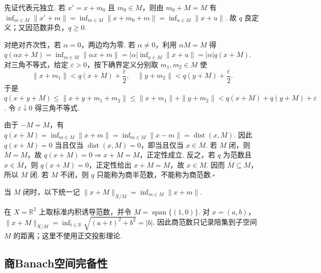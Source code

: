 \begin{FAProof}
先证代表元独立. 若 \(\displaystyle x'=x+m_0\) 且 \(\displaystyle m_0\in M\)，则由 \(\displaystyle m_0+M=M\) 有 \(\displaystyle \inf_{m\in M}\|x'+m\| =\inf_{m\in M}\|x+m_0+m\| =\inf_{u\in M}\|x+u\|\).
故 \(\displaystyle q\) 良定义；又因范数非负，\(\displaystyle q\geqslant0\).

对绝对齐次性，若 \(\displaystyle \alpha=0\)，两边均为零. 若 \(\displaystyle \alpha\neq0\)，利用 \(\displaystyle \alpha M=M\) 得 \(\displaystyle q(\alpha x+M) =\inf_{m\in M}\|\alpha x+m\| =|\alpha|\inf_{u\in M}\|x+u\| =|\alpha|q(x+M)\).
对三角不等式，给定 \(\displaystyle \varepsilon>0\)，按下确界定义分别取 \(\displaystyle m_1,m_2\in M\) 使
\[
\|x+m_1\|<q(x+M)+\frac{\varepsilon}{2},
\quad
\|y+m_2\|<q(y+M)+\frac{\varepsilon}{2}.
\]
于是 \(\displaystyle q(x+y+M) \leqslant\|x+y+m_1+m_2\| \leqslant\|x+m_1\|+\|y+m_2\| <q(x+M)+q(y+M)+\varepsilon\).
令 \(\displaystyle \varepsilon\downarrow0\) 得三角不等式.

由于 \(\displaystyle -M=M\)，有 \(\displaystyle q(x+M)=\inf_{m\in M}\|x+m\| =\inf_{m\in M}\|x-m\| =\operatorname{dist}(x,M)\).
因此 \(\displaystyle q(x+M)=0\) 当且仅当 \(\displaystyle \operatorname{dist}(x,M)=0\)，即当且仅当 \(\displaystyle x\in\overline M\). 若 \(\displaystyle M\) 闭，则 \(\displaystyle \overline M=M\)，故 \(\displaystyle q(x+M)=0\Rightarrow x+M=M\)，正定性成立. 反之，若 \(\displaystyle q\) 为范数且 \(\displaystyle x\in\overline M\)，则 \(\displaystyle q(x+M)=0\)，正定性给出 \(\displaystyle x+M=M\)，故 \(\displaystyle x\in M\). 因而 \(\displaystyle \overline M\subseteq M\)，所以 \(\displaystyle M\) 闭. 若 \(\displaystyle M\) 不闭，则 \(\displaystyle q\) 只能称为商半范数，不能称为商范数.\hfill\(\square\)
\end{FAProof}

当 \(\displaystyle M\) 闭时，以下统一记 \(\displaystyle \|x+M\|_{X/M}=\inf_{m\in M}\|x+m\|\).

\begin{FAExample}[二维商空间的距离解释]
在 \(\displaystyle X=\mathbb R^2\) 上取标准内积诱导范数，并令 \(\displaystyle M=\operatorname{span}\{(1,0)\}\). 对 \(\displaystyle x=(a,b)\)， \(\displaystyle \|x+M\|_{X/M} =\inf_{t\in\mathbb R}\sqrt{(a+t)^2+b^2} =|b|\).
因此商范数只记录陪集到子空间 \(\displaystyle M\) 的距离；这里不使用正交投影理论.
\end{FAExample}

\clearpage
\subsection{商Banach空间完备性}


